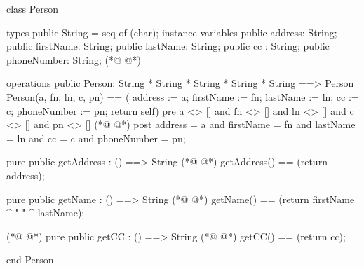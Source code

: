 \begin{vdmpp}[breaklines=true]
class Person

types
 public String = seq of (char);
instance variables
  public address: String;
  public firstName: String;
  public lastName: String;
  public cc : String;
  public phoneNumber: String;
(*@
\label{Person:11}
@*)
  
operations
 public Person: String * String * String * String * String ==> Person
  Person(a, fn, ln, c, pn) == ( address := a; firstName := fn; lastName := ln; cc := c; phoneNumber := pn; return self)
 pre a <> [] and fn <> [] and ln <> [] and c <> [] and pn <> []
(*@
\label{getAddress:16}
@*)
 post address = a and firstName = fn and lastName = ln and cc = c and phoneNumber = pn;
 
 pure public getAddress : () ==> String
(*@
\label{getName:19}
@*)
  getAddress() == (return address);
  
 pure public getName : () ==> String
(*@
\label{getFirstName:22}
@*)
  getName() == (return firstName ^ " " ^ lastName);
  
(*@
\label{getCC:24}
@*)
 pure public getCC : () ==> String
(*@
\label{getLastName:25}
@*)
  getCC() == (return cc);

end Person
\end{vdmpp}

